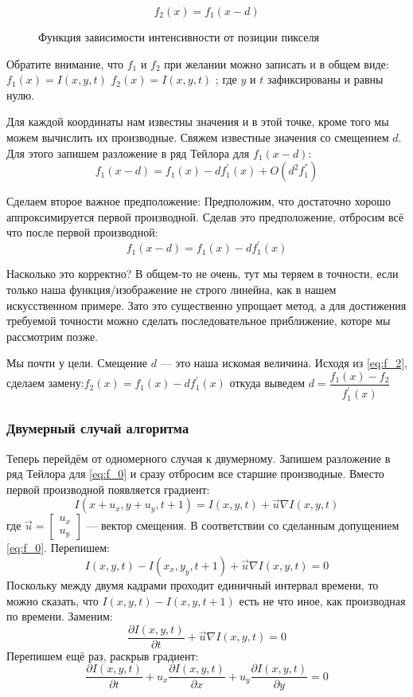 \label{eq:f_2}
\begin{equation}
f_2(x)=f_1(x-d)
\end{equation}

\begin{figure}[ht]
\caption{Функция зависимости интенсивности от позиции пикселя}
\label{pic:math_2}
\end{figure}

Обратите внимание, что $f_1$ и $f_2$ при желании можно записать и в общем виде: $f_1(x)=I(x,y,t)$ $f_2(x)=I(x,y,t)$ ; где $y$ и $t$ зафиксированы и равны нулю.

Для каждой координаты нам известны значения и в этой точке, кроме того мы можем вычислить их производные. Свяжем известные значения со смещением $d$. Для этого запишем разложение в ряд Тейлора для $f_1(x-d)$:
$$f_1(x-d)=f_1(x)-df^{'}_1(x)+O(d^2f^{''}_1)$$

Сделаем второе важное предположение: Предположим, что достаточно хорошо аппроксимируется первой производной. Сделав это предположение, отбросим всё что после первой производной:
$$f_1(x-d)=f_1(x)-df_1^{'}(x)$$

Насколько это корректно? В общем-то не очень, тут мы теряем в точности, если только наша функция/изображение не строго линейна, как в нашем искусственном примере. Зато это существенно упрощает метод, а для достижения требуемой точности можно сделать последовательное приближение, которе мы рассмотрим позже.

Мы почти у цели. Смещение $d$ — это наша искомая величина. Исходя из \ref{eq:f_2}, сделаем замену:$f_2(x)=f_1(x)-df_1^{'}(x)$
откуда выведем $d = \dfrac{f_1(x)-f_2}{f_1^{'}(x)}$
\subsubsection{Двумерный случай алгоритма}

Теперь перейдём от одномерного случая к двумерному. Запишем разложение в ряд Тейлора для \ref{eq:f_0} и сразу отбросим все старшие производные. Вместо первой производной появляется градиент:
$$I(x+u_x,y+u_y,t+1)=I(x,y,t)+\overrightarrow{u} \nabla I(x,y,t)$$
где $\overrightarrow{u} = \begin{bmatrix}
u_x\\
u_y
\end{bmatrix} $ — вектор смещения.
В соответствии со сделанным допущением \ref{eq:f_0}. Перепишем:
$$I(x,y,t)-I(x_x,y_y,t+1) + \overrightarrow{u} \nabla I(x,y,t) = 0$$
Поскольку между двумя кадрами проходит единичный интервал времени, то можно сказать, что $I(x,y,t)-I(x,y,t+1)$ есть не что иное, как производная по времени.
Заменим:
$$\frac{\partial I(x,y,t)}{\partial t} + \overrightarrow{u} \nabla I(x,y,t) = 0$$
Перепишем ещё раз, раскрыв градиент:
$$\frac{\partial I(x,y,t)}{\partial t} + u_x\frac{\partial I(x,y,t)}{\partial x} + u_y\frac{\partial I(x,y,t)}{\partial y} = 0$$

